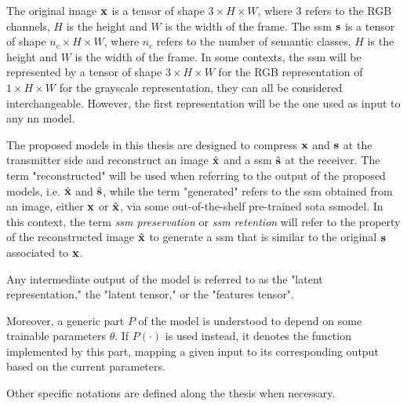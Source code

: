 The original image $\mathbf{x}$ is a tensor of shape $3 \times H \times W $, where $3$ refers to the RGB channels, $H$ is the height and $W$ is the width of the frame. The \gls{ssm} $\mathbf{s}$ is a tensor of shape $n_c \times H \times W $, where $n_c$ refers to the number of semantic classes, $H$ is the height and $W$ is the width of the frame. In some contexts, the \gls{ssm} will be represented by a tensor of shape $3 \times H \times W $ for the RGB representation of $1 \times H \times W $ for the grayscale representation, they can all be considered interchangeable. However, the first representation will be the one used as input to any \gls{nn} model.

The proposed models in this thesis are designed to compress $\mathbf{x}$ and $\mathbf{s}$ at the transmitter side and reconstruct an image $\hat{\mathbf{x}}$ and a \gls{ssm} $\hat{\mathbf{s}}$ at the receiver. The term "reconstructed" will be used when referring to the output of the proposed models, i.e. $\hat{\mathbf{x}}$ and  $\hat{\mathbf{s}}$, while the term "generated" refers to the \gls{ssm} obtained from an image, either $\mathbf{x}$ or $\hat{\mathbf{x}}$, via some out-of-the-shelf pre-trained \gls{sota} \gls{ssmodel}. In this context, the term \textit{\gls{ssm} preservation} or \textit{\gls{ssm} retention} will refer to the property of the reconstructed image $\hat{\mathbf{x}}$ to generate a \gls{ssm} that is similar to the original $\mathbf{s}$ associated to $\mathbf{x}$. 

Any intermediate output of the model is referred to as the "latent representation," the "latent tensor," or the "features tensor".  

Moreover, a generic part $P$ of the model is understood to depend on some trainable parameters $\theta$. If 
$P(\cdot)$ is used instead, it denotes the function implemented by this part, mapping a given input to its corresponding output based on the current parameters.

Other specific notations are defined along the thesis when necessary.


